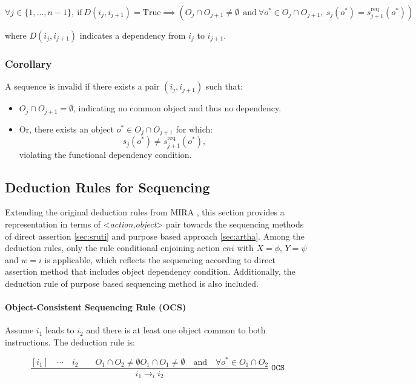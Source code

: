 \documentclass[a4paper,11pt]{lmcs}
\begin{document}
\[
\forall j \in \{1, \ldots, n-1\},\
\text{if}\ D(i_j, i_{j+1}) = \text{True}
\implies
\left( O_j \cap O_{j+1} \neq \emptyset\
\ \text{and}\
\forall o^* \in O_j \cap O_{j+1},\ s_j(o^*) = s_{j+1}^{\mathrm{req}}(o^*) \right)
\]

where $D(i_j, i_{j+1})$ indicates a dependency from $i_j$ to $i_{j+1}$.


\subsubsection{Corollary}
A sequence is invalid if there exists a pair \( (i_j, i_{j+1}) \) such that:
\begin{itemize}
  \item \( O_j \cap O_{j+1} = \emptyset \), indicating no common object and thus no dependency.
  \item Or, there exists an object \( o^* \in O_j \cap O_{j+1} \) for which:
    \[
    s_j(o^*) \neq s_{j+1}^{\mathrm{req}}(o^*),
    \]
    violating the functional dependency condition.
\end{itemize}
\subsection{Deduction Rules for Sequencing}

Extending the original deduction rules from MIRA \cite{mira}, this section provides a representation in terms of <\textit{action,object}> pair towards the sequencing methods of direct assertion \ref{sec:sruti} and purpose based approach \ref{sec:artha}. Among the deduction rules, only the rule conditional enjoining action $cni$ with $X = \phi$, $Y = \psi$ and $w = i$ is applicable, which reflects the sequencing according to direct assertion method that includes object dependency condition. Additionally, the deduction rule of purpose based sequencing method is also included.


\paragraph{Object-Consistent Sequencing Rule (OCS)}

Assume $i_1$ leads to $i_2$ and there is at least one object common to both instructions. The deduction rule is:

\[
\frac{
    [i_1] \quad \cdots \quad i_2 \qquad O_1 \cap O_2 \neq \emptyset O_1 \cap O_{1} \neq \emptyset \quad \text{and} \quad
\forall o^* \in O_1 \cap O_2
}{
    i_1 \rightarrow_i i_2
} \;\texttt{OCS}
\]
\end{document}
